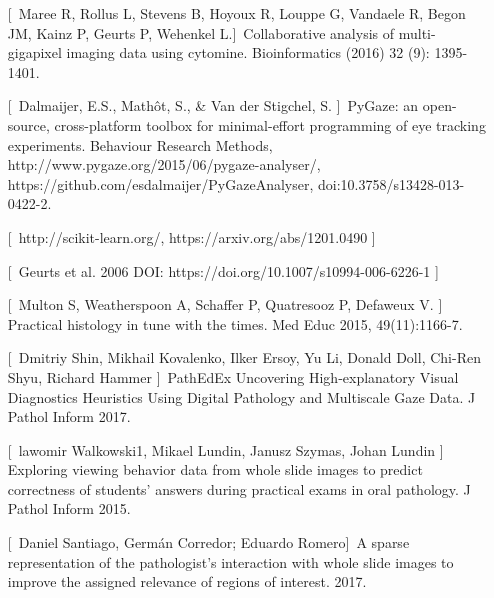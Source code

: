 \documentclass[a4paper,11pt]{report}
\numberwithin{figure}{section} %
\begin{document}
    \begin{itemize}
        \item[\textbullet] [\, Maree R, Rollus L, Stevens B, Hoyoux R, Louppe G, Vandaele R, Begon JM, Kainz P, Geurts P, Wehenkel L.]\, Collaborative analysis of multi-gigapixel imaging data using cytomine. Bioinformatics (2016) 32 (9): 1395-1401.
        \item[\textbullet] [\, Dalmaijer, E.S., Math\^{o}t, S., \& Van der Stigchel, S. ]\, PyGaze: an open-source, cross-platform toolbox for minimal-effort programming of eye tracking experiments. Behaviour Research Methods, http://www.pygaze.org/2015/06/pygaze-analyser/,\\ https://github.com/esdalmaijer/PyGazeAnalyser, doi:10.3758/s13428-013-0422-2.
        \item[\textbullet] [\, http://scikit-learn.org/, https://arxiv.org/abs/1201.0490 ]\,
        \item[\textbullet] [\, Geurts et al. 2006 DOI: https://doi.org/10.1007/s10994-006-6226-1 ]\,
        \item[\textbullet] [\, Multon S, Weatherspoon A, Schaffer P, Quatresooz P, Defaweux V. ]\, Practical histology in tune with the times. Med Educ 2015, 49(11):1166-7.
        \item[\textbullet] [\, Dmitriy Shin, Mikhail Kovalenko, Ilker Ersoy, Yu Li, Donald Doll, Chi-Ren Shyu, Richard Hammer ]\, PathEdEx \- Uncovering High‑explanatory Visual Diagnostics Heuristics Using Digital Pathology and Multiscale Gaze Data. J Pathol Inform 2017.
        \item[\textbullet] [\, lawomir Walkowski1, Mikael Lundin, Janusz Szymas, Johan Lundin ]\, Exploring viewing behavior data from whole slide images to predict correctness of students’ answers during practical exams in oral pathology. J Pathol Inform 2015.
        \item[\textbullet] [\, Daniel Santiago, Germ\'{a}n Corredor; Eduardo Romero]\, A sparse representation of the pathologist's interaction with whole slide images to improve the assigned relevance of regions of interest. 2017.
    \end{itemize}
\end{document}
